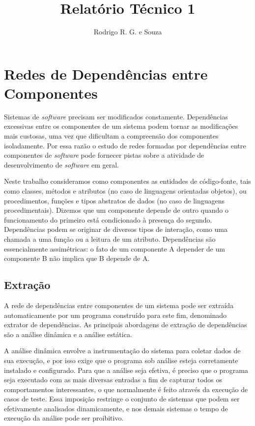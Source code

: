 ﻿\documentclass{article}
\begin{document}
\title{Relatório Técnico 1}
\author{Rodrigo R. G. e Souza}
\maketitle

\section{Redes de Dependências entre Componentes}

Sistemas de \textit{software} precisam ser modificados constamente. Dependências excessivas entre os componentes de um sistema podem tornar as modificações mais custosas, uma vez que dificultam a compreensão dos componentes isoladamente. Por essa razão o estudo de redes formadas por dependências entre componentes de \textit{software} pode fornecer pistas sobre a atividade de desenvolvimento de \textit{software} em geral.

Neste trabalho consideramos como componentes as entidades de código-fonte, tais como classes, métodos e atributos (no caso de linguagens orientadas objetos), ou procedimentos, funções e tipos abstratos de dados (no caso de linguagens procedimentais). Dizemos que um componente depende de outro quando o funcionamento do primeiro está condicionado à presença do segundo. Dependências podem se originar de diversos tipos de interação, como uma chamada a uma função ou a leitura de um atributo. Dependências são essencialmente assimétricas: o fato de um componente A depender de um componente B não implica que B depende de A.


\subsection{Extração}

A rede de dependências entre componentes de um sistema pode ser extraída automaticamente por um programa construído para este fim, denominado extrator de dependências. As principais abordagens de extração de dependências são a análise dinâmica e a análise estática. 

A análise dinâmica envolve a instrumentação do sistema para coletar dados de sua execução, e por isso exige que o programa sob análise esteja corretamente instalado e configurado. Para que a análise seja efetiva, é preciso que o programa seja executado com as mais diversas entradas a fim de capturar todos os comportamentos interessantes, o que normalmente é feito através da execução de casos de teste. Essa imposição restringe o conjunto de sistemas que podem ser efetivamente analisados dinamicamente, e nos demais sistemas o tempo de execução da análise pode ser proibitivo.
\end{document}

